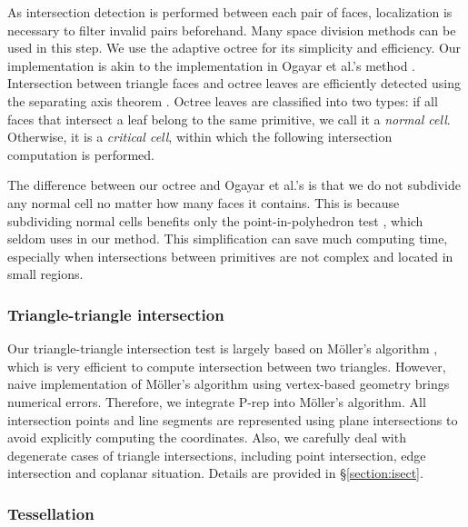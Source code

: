 \documentclass[10pt,journal,compsoc]{IEEEtran}
\begin{document}
As intersection detection is performed between each pair of faces, localization is necessary to filter invalid pairs beforehand. Many space division methods can be used in this step. We use the adaptive octree for its simplicity and efficiency. Our implementation is akin to the implementation in Ogayar et al.'s method \cite{ogayar2015deferred}. Intersection between triangle faces and octree leaves are efficiently detected using the separating axis theorem \cite{gottschalk1996obbtree}. Octree leaves are classified into two types: if all faces that intersect a leaf belong to the same primitive, we call it a \emph{normal cell}. Otherwise, it is a \emph{critical cell}, within which the following intersection computation is performed.


The difference between our octree and Ogayar et al.'s is that we do not subdivide any normal cell no matter how many faces it contains. This is because subdividing normal cells benefits only the point-in-polyhedron test  \cite{frisken2002simple}, which seldom uses in our method. This simplification can save much computing time, especially when intersections between primitives are not complex and located in small regions.



\subsubsection{Triangle-triangle intersection}

Our triangle-triangle intersection test is largely based on M\"{o}ller's algorithm \cite{moller1997fast}, which is very efficient to compute intersection between two triangles. However, naive implementation of M\"{o}ller's algorithm using vertex-based geometry brings numerical errors. Therefore, we integrate P-rep into M\"{o}ller's algorithm. All intersection points and line segments are represented using plane intersections to avoid explicitly computing the coordinates. Also, we carefully deal with degenerate cases of triangle intersections, including point intersection, edge intersection and coplanar situation. Details are provided in \S\ref{section:isect}.

\subsubsection{Tessellation}
\end{document}

